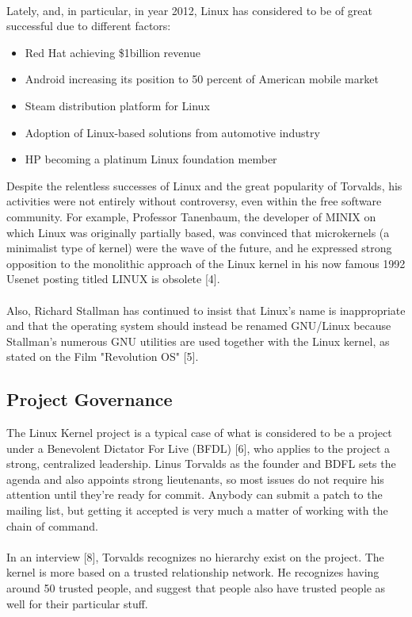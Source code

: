 \documentclass[11pt]{article}
\begin{document}
\\
Lately, and, in particular, in year 2012, Linux has considered to be of great successful due to different factors:\\
\begin{itemize}\itemsep0pt
\item{Red Hat achieving \$1billion revenue}
\item{Android increasing its position to 50 percent of American mobile market}
\item{Steam distribution platform for Linux}
\item{Adoption of Linux-based solutions from automotive industry}
\item{HP becoming a platinum Linux foundation member}
\end{itemize}
Despite the relentless successes of Linux and the great popularity of Torvalds, his activities were not entirely without controversy, even within the free software community. For example, Professor Tanenbaum, the developer of MINIX on which Linux was originally partially based, was convinced that microkernels (a minimalist type of kernel) were the wave of the future, and he expressed strong opposition to the monolithic approach of the Linux kernel in his now famous 1992 Usenet posting titled LINUX is obsolete [4].\\
\\
Also, Richard Stallman has continued to insist that Linux's name is inappropriate and that the operating system should instead be renamed GNU/Linux because Stallman's numerous GNU utilities are used together with the Linux kernel, as stated on the Film "Revolution OS" [5].

\subsection{Project Governance}
The Linux Kernel project is a typical case of what is considered to be a project under a Benevolent Dictator For Live (BFDL) [6], who applies to the project a strong, centralized leadership. Linus Torvalds as the founder and BDFL sets the agenda and also appoints strong lieutenants, so most issues do not require his attention until they're ready for commit. Anybody can submit a patch to the mailing list, but getting it accepted is very much a matter of working with the chain of command.\\
\\
In an interview [8], Torvalds recognizes no hierarchy exist on the project. The kernel is more based on a trusted relationship network. He recognizes having around 50 trusted people, and suggest that people also have trusted people as well for their particular stuff. 
\end{document}
